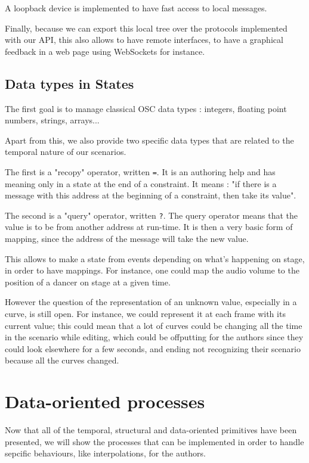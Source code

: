 \documentclass{sigchi}
\begin{document}
A loopback device is implemented to have fast access to local messages.

Finally, because we can export this local tree over the protocols implemented with our API, this also allows to have remote interfaces, to have a graphical feedback in a web page using WebSockets for instance.

\subsection{Data types in States}
The first goal is to manage classical OSC data types : integers, floating point numbers, strings, arrays...

Apart from this, we also provide two specific data types that are related to the temporal nature of our scenarios.

The first is a "recopy" operator, written \texttt{=}. It is an authoring help and has meaning only in a state at the end of a constraint. It means : "if there is a message with this address at the beginning of a constraint, then take its value".

The second is a "query" operator, written \texttt{?}. The query operator means that the value is to be from another address at run-time. It is then a very basic form of mapping, since the address of the message will take the new value.

This allows to make a state from events depending on what's happening on stage, in order to have mappings. For instance, one could map the audio volume to the position of a dancer on stage at a given time.

However the question of the representation of an unknown value, especially in a curve, is still open. For instance, we could represent it at each frame with its current value; this could mean that a lot of curves could be changing all the time in the scenario while editing, which could be offputting for the authors since they could look elsewhere for a few seconds, and ending not recognizing their scenario because all the curves changed. 


\section{Data-oriented processes}
Now that all of the temporal, structural and data-oriented primitives have been presented, we will show the processes that can be implemented in order to handle sepcific behaviours, like interpolations, for the authors.
\end{document}
